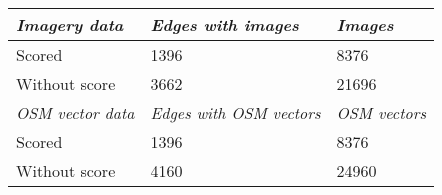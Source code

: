 \documentclass[border={5pt 3pt 5pt 3pt}, varwidth=40em]{standalone}
\begin{document}
\begin{table}[]
\centering
\begin{tabular}{l|ll}
\hline
\textit{Imagery data}    & \textit{Edges with images}      & \textit{Images}      \\ \hline
Scored                   & 1396                            & 8376                 \\
Without score            & 3662                            & 21696                \\ \hline
\textit{OSM vector data} & \textit{Edges with OSM vectors} & \textit{OSM vectors} \\ \hline
Scored                   & 1396                            & 8376                 \\
Without score            & 4160                            & 24960                \\ \hline
\end{tabular}
\end{table}
\end{document}

